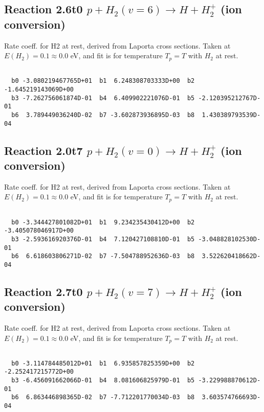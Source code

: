 \documentclass[12pt,dvipdfmx]{article}
\begin{document}
\newpage
\subsection{
Reaction 2.6t0
$ p + H_2(v=6) \rightarrow H + H_2^+$ (ion conversion)
}
Rate coeff. for H2 at rest, derived from Laporta cross sections.
Taken at $E(H_2) = 0.1 \approx 0.0$ eV,  and fit is for temperature $T_p=T$ with $H_2$ at rest.

\begin{small}\begin{verbatim}

  b0 -3.080219467765D+01  b1  6.248308703333D+00  b2 -1.645219143069D+00
  b3 -7.262756061874D-01  b4  6.409902221076D-01  b5 -2.120395212767D-01
  b6  3.789449036240D-02  b7 -3.602873936895D-03  b8  1.430389793539D-04

\end{verbatim}\end{small}

\newpage
\subsection{
Reaction 2.0t7
$ p + H_2(v=0) \rightarrow H + H_2^+$ (ion conversion)
}
Rate coeff. for H2 at rest, derived from Laporta cross sections.
Taken at $E(H_2) = 0.1 \approx 0.0$ eV,  and fit is for temperature $T_p=T$ with $H_2$ at rest.

\begin{small}\begin{verbatim}

  b0 -3.344427801082D+01  b1  9.234235430412D+00  b2 -3.405078046917D+00
  b3 -2.593616920376D-01  b4  7.120427108810D-01  b5 -3.048828102530D-01
  b6  6.618603806271D-02  b7 -7.504788952636D-03  b8  3.522620418662D-04

\end{verbatim}\end{small}

\newpage
\subsection{
Reaction 2.7t0
$ p + H_2(v=7) \rightarrow H + H_2^+$ (ion conversion)
}
Rate coeff. for H2 at rest, derived from Laporta cross sections.
Taken at $E(H_2) = 0.1 \approx 0.0$ eV,  and fit is for temperature $T_p=T$ with $H_2$ at rest.

\begin{small}\begin{verbatim}

  b0 -3.114784485012D+01  b1  6.935857825359D+00  b2 -2.252417215772D+00
  b3 -6.456091662066D-01  b4  8.081606825979D-01  b5 -3.229988870612D-01
  b6  6.863446898365D-02  b7 -7.712201770034D-03  b8  3.603574766693D-04

\end{verbatim}\end{small}
\end{document}
